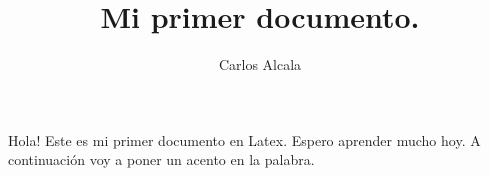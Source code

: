\documentclass{article}
\title{Mi primer documento.}
\author{Carlos Alcala}
\begin{document}
	\maketitle
	Hola! Este es mi primer documento en Latex. Espero aprender mucho hoy. 
	A continuación voy a poner un acento en la palabra.
\end{document}
